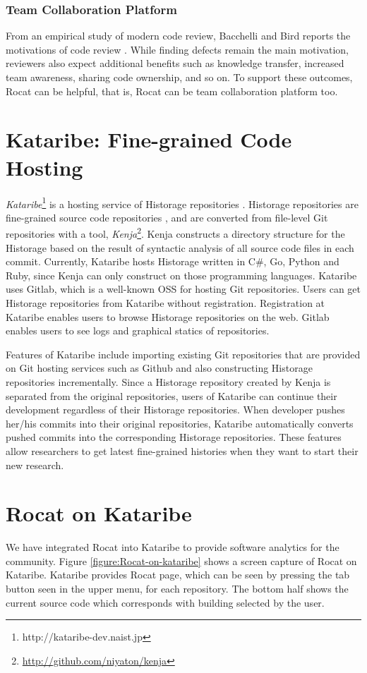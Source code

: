 \documentclass[conference]{IEEEtran}
\newcommand{\figref}[1]{Figure \ref{#1}}
\begin{document}
\subsubsection{Team Collaboration Platform}
From an empirical study of modern code review, Bacchelli and Bird reports the motivations of code review \cite{Bacchelli:2013:EOC:2486788.2486882}. While finding defects remain the main motivation, reviewers also expect additional benefits such as knowledge transfer, increased team awareness, sharing code ownership, and so on.
To support these outcomes, Rocat can be helpful, that is, Rocat can be team collaboration platform too.

\section{Kataribe: Fine-grained Code Hosting}
\textit{Kataribe}\footnote{http://kataribe-dev.naist.jp} is a hosting service of Historage repositories \cite{Fujiwara:2014:KHS:2597073.2597125}.
Historage repositories are fine-grained source code repositories \cite{Hata:2011:HFV:2024445.2024463}, and are converted from file-level Git repositories with a tool, \textit{Kenja}\footnote{\url{http://github.com/niyaton/kenja}}.
Kenja constructs a directory structure for the Historage based on the result of syntactic analysis of all source code files in each commit.
Currently, Kataribe hosts Historage written in C\#, Go, Python and Ruby, since Kenja can only construct on those programming languages.
Kataribe uses Gitlab, which is a well-known OSS for hosting Git repositories.
Users can get Historage repositories from Kataribe without registration.
Registration at Kataribe enables users to browse Historage repositories on the web.
Gitlab enables users to see logs and graphical statics of repositories.

Features of Kataribe include importing existing Git repositories that are provided on Git hosting services such as Github and also constructing Historage repositories incrementally.
Since a Historage repository created by Kenja is separated from the original repositories, users of Kataribe can continue their development regardless of their Historage repositories.
When developer pushes her/his commits into their original repositories, Kataribe automatically converts pushed commits into the corresponding Historage repositories.
These features allow researchers to get latest fine-grained histories when they want to start their new research.

\section{Rocat on Kataribe}
We have integrated Rocat into Kataribe to provide software analytics for the community.
\figref{figure:Rocat-on-kataribe} shows a screen capture of Rocat on Kataribe.
Kataribe provides Rocat page, which can be seen by pressing the tab button seen in the upper menu, for each repository.
The bottom half shows the current source code which corresponds with building selected by the user.
\end{document}
